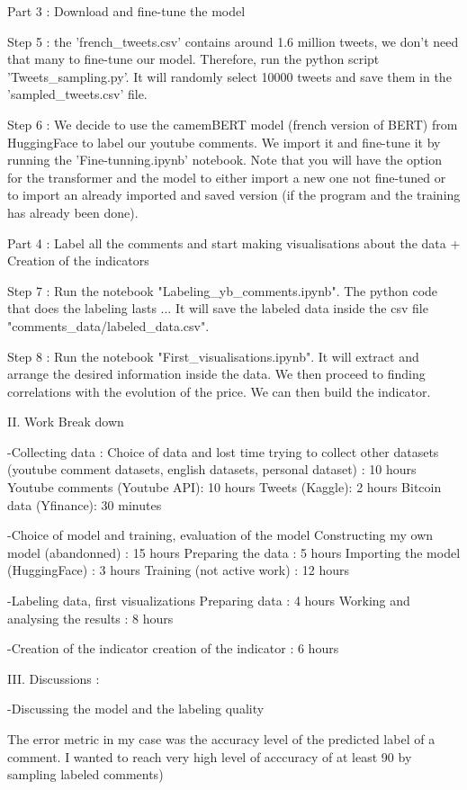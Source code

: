 Part 3 : Download and fine-tune the model 

Step 5 : the 'french_tweets.csv' contains around 1.6 million tweets, we don't need that many to fine-tune our model. Therefore, run the python 
script 'Tweets_sampling.py'. It will randomly select 10000 tweets and save them in the 'sampled_tweets.csv' file. 

Step 6 : We decide to use the camemBERT model (french version of BERT) from HuggingFace to label our youtube comments. We import it and fine-tune
it by running the 'Fine-tunning.ipynb' notebook. Note that you will have the option for the transformer and the model to either import a new one
not fine-tuned or to import an already imported and saved version (if the program and the training has already been done).

Part 4 : Label all the comments and start making visualisations about the data + Creation of the indicators 

Step 7 : Run the notebook "Labeling_yb_comments.ipynb". The python code that does the labeling lasts ... It will save the labeled data inside the 
csv file "comments_data/labeled_data.csv". 

Step 8 : Run the notebook "First_visualisations.ipynb". It will extract and arrange the desired information inside the data. We then proceed to
finding correlations with the evolution of the price. We can then build the indicator.



II. Work Break down 

-Collecting data : 
Choice of data and lost time trying to collect other datasets (youtube comment datasets, english datasets, personal dataset) : 10 hours
Youtube comments (Youtube API): 10 hours
Tweets (Kaggle): 2 hours
Bitcoin data (Yfinance): 30 minutes

-Choice of model and training, evaluation of the model 
Constructing my own model (abandonned) : 15 hours
Preparing the data : 5 hours
Importing the model (HuggingFace) : 3 hours
Training (not active work) : 12 hours  

-Labeling data, first visualizations 
Preparing data : 4 hours 
Working and analysing the results : 8 hours

-Creation of the indicator
creation of the indicator : 6 hours


III. Discussions : 

-Discussing the model and the labeling quality 

The error metric in my case was the accuracy level of the predicted label of a comment.
I wanted to reach very high level of acccuracy of at least 90%
by sampling labeled comments)

